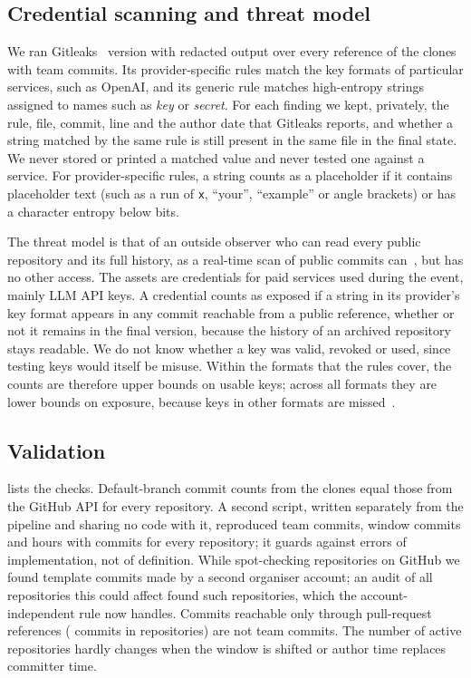 \documentclass{article}
\begin{document}
\subsection{Credential scanning and threat model}
We ran Gitleaks~\cite{gitleaks2026} version \gitleaksversion{} with redacted output over every reference of the \NRqFourScannedRepos{} clones with team commits. Its provider-specific rules match the key formats of particular services, such as OpenAI, and its generic rule matches high-entropy strings assigned to names such as \emph{key} or \emph{secret}. For each finding we kept, privately, the rule, file, commit, line and the author date that Gitleaks reports, and whether a string matched by the same rule is still present in the same file in the final state. We never stored or printed a matched value and never tested one against a service. For provider-specific rules, a string counts as a placeholder if it contains placeholder text (such as a run of \texttt{x}, ``your'', ``example'' or angle brackets) or has a character entropy below \entropythr{} bits.

The threat model is that of an outside observer who can read every public repository and its full history, as a real-time scan of public commits can~\cite{meli2019git}, but has no other access. The assets are credentials for paid services used during the event, mainly LLM API keys. A credential counts as exposed if a string in its provider's key format appears in any commit reachable from a public reference, whether or not it remains in the final version, because the history of an archived repository stays readable. We do not know whether a key was valid, revoked or used, since testing keys would itself be misuse. Within the formats that the rules cover, the counts are therefore upper bounds on usable keys; across all formats they are lower bounds on exposure, because keys in other formats are missed~\cite{basak2023tools}.

\subsection{Validation}
 lists the checks. Default-branch commit counts from the clones equal those from the GitHub API for every repository. A second script, written separately from the pipeline and sharing no code with it, reproduced team commits, window commits and hours with commits for every repository; it guards against errors of implementation, not of definition. While spot-checking repositories on GitHub we found template commits made by a second organiser account; an audit of all \NValidationTemplateAuditN{} repositories this could affect found \NValidationTemplateFixes{} such repositories, which the account-independent rule now handles. Commits reachable only through pull-request references (\NValidationPrOnlyCommits{} commits in \NValidationPrOnlyRepos{} repositories) are not team commits. The number of active repositories hardly changes when the window is shifted or author time replaces committer time.
\end{document}
